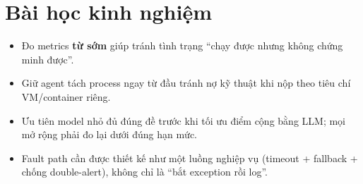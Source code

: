 \documentclass[12pt,a4paper,oneside]{report}
\begin{document}
\section{Bài học kinh nghiệm}

\begin{itemize}
  \item Đo metrics \textbf{từ sớm} giúp tránh tình trạng ``chạy được nhưng không chứng minh được''.
  \item Giữ agent tách process ngay từ đầu tránh nợ kỹ thuật khi nộp theo tiêu chí VM/container riêng.
  \item Ưu tiên model nhỏ đủ đúng đề trước khi tối ưu điểm cộng bằng LLM; mọi mở rộng phải đo lại dưới đúng hạn mức.
  \item Fault path cần được thiết kế như một luồng nghiệp vụ (timeout + fallback + chống double-alert), không chỉ là ``bắt exception rồi log''.
\end{itemize}



\end{document}
